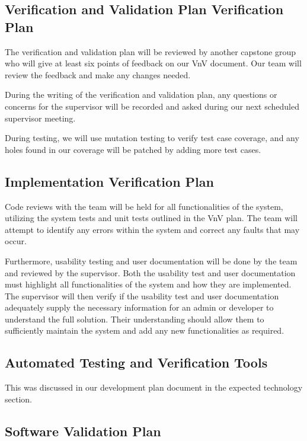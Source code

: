 \documentclass[12pt, titlepage]{article}
\begin{document}
\subsection{Verification and Validation Plan Verification Plan}

The verification and validation plan will be reviewed by another capstone
group who will give at least six points of feedback on our VnV document. Our
team will review the feedback and make any changes needed. 

During the writing of the verification and validation plan, any questions or
concerns for the supervisor will be recorded and asked during our next
scheduled supervisor meeting.

During testing, we will use mutation testing to verify test case coverage, and
any holes found in our coverage will be patched by adding more test cases.

\subsection{Implementation Verification Plan}

Code reviews with the team will be held for all functionalities of the system, utilizing the
system tests and unit tests outlined in the VnV plan. The team will attempt to identify any
errors within the system and correct any faults that may occur.

Furthermore, usability testing and user documentation will be done by the team and
reviewed by the supervisor. Both the usability test and user documentation must highlight
all functionalities of the system and how they are implemented. The supervisor will then
verify if the usability test and user documentation adequately supply the necessary
information for an admin or developer to understand the full solution. Their understanding
should allow them to sufficiently maintain the system and add any new functionalities as
required.

\subsection{Automated Testing and Verification Tools}

This was discussed in our development plan document \cite{DP} 
in the expected technology section.

\subsection{Software Validation Plan}
\end{document}
